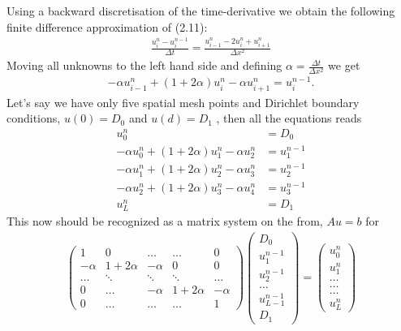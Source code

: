 \documentclass[11pt,a4paper,draft]{article}
\numberwithin{equation}{section}
\begin{document}
Using a backward discretisation of the time-derivative we obtain the following finite difference approximation of (2.11):
\begin{align}
\frac{u_{i}^{n}-u_{i}^{n-1}}{\Delta t} = \frac{u_{i-1}^{n}-2u_{i}^{n}+u_{i+1}^{n}}{\Delta x^2}
\end{align}
Moving all unknowns to the left hand side and defining $\alpha = \frac{\Delta t}{\Delta x^2}$ we get
\begin{align*}
-\alpha u_{i-1}^n + (1+2\alpha)u_i^n - \alpha u_{i+1}^n = u_i^{n-1}. 
\end{align*}
Let's say we have only five spatial mesh points and Dirichlet boundary conditions, $u(0)=D_0$ and $u(d)=D_1$ , then all the equations reads
\begin{align*}
u_0^n &= D_0 \\
-\alpha u_{0}^n + (1+2\alpha)u_1^n - \alpha u_{2}^n &= u_1^{n-1} \\
-\alpha u_{1}^n + (1+2\alpha)u_2^n - \alpha u_{3}^n &= u_2^{n-1} \\
-\alpha u_{2}^n + (1+2\alpha)u_3^n - \alpha u_{4}^n &= u_3^{n-1} \\
u_L^n &= D_1 
\end{align*}
This now should be recognized as a matrix system on the from, $Au=b$ for 
\begin{align}
\begin{pmatrix} 1 & 0 & \dots   & \dots         & 0 \\
                -\alpha & 1+2\alpha & -\alpha & 0           &0 \\
        \dots  & \ddots & \ddots & \ddots         & \dots\\
 0   & \dots &  -\alpha & 1+2\alpha & -\alpha \\
 0   & \dots & \dots & \dots    &  1
             \end{pmatrix}
\begin{pmatrix} D_0 \\
      u_1^{n-1} \\
      u_2^{n-1}\\ \dots\\ u_{L-1}^{n-1}\\
      D_1
\end{pmatrix} 
=  \begin{pmatrix} u_0^n \\
                   u_1^n  \\
           \dots\\ \dots\\ \dots\\
                   u_L^n 
             \end{pmatrix} 
\end{align} 
\end{document}
